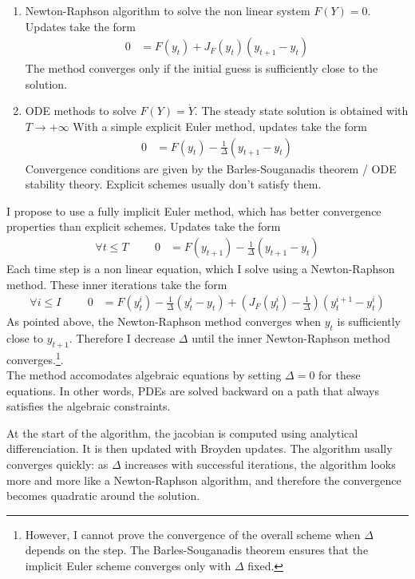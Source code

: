 \documentclass[english]{article}
\begin{document}
\begin{enumerate}
	\item Newton-Raphson algorithm to solve the non linear system $F (Y ) = 0$. Updates take the form
	\begin{align*}
		0 &= F(y_{t}) + J_{F}(y_t) (y_{t+1} - y_t)
	\end{align*}
	The method converges only if the initial guess is sufficiently close to the solution. 
	\item ODE methods to solve $F(Y) = \dot{Y}$. The steady state solution is obtained with $T\rightarrow +\infty$
	With a simple explicit Euler method, updates take the form
	\begin{align*}
		0&= F(y_t) - \frac{1}{\Delta} (y_{t+1} -y_{t})
	\end{align*}
	Convergence conditions are given by the Barles-Souganadis theorem / ODE stability theory. Explicit schemes usually don't satisfy them.
\end{enumerate}
I propose to use a fully implicit Euler method, which has better convergence properties than explicit schemes.  Updates take the form 
\begin{align*}
	\forall t \leq T \hspace{1cm} 0&= F(y_{t+1}) - \frac{1}{\Delta}(y_{t+1} -y_{t})
\end{align*}
Each time step is a non linear equation, which I solve using a Newton-Raphson method. These inner iterations take the form
\begin{align*}
	\forall i \leq I \hspace{1cm}	0 &= F(y_{t}^i) - \frac{1}{\Delta}(y_{t}^{i} -y_{t}) + (J_{F}(y_t^i) -  \frac{1}{\Delta})(y^{i+1}_{t} - y_t^i)
\end{align*}
As pointed above, the Newton-Raphson method converges when $y_t$ is sufficiently close to $y_{t+1}$. Therefore I decrease $\Delta$ until the inner Newton-Raphson method converges.\footnote{However, I cannot prove the convergence of the overall scheme when $\Delta$ depends on the step. The Barles-Souganadis theorem ensures that the implicit Euler scheme converges only with $\Delta$ fixed. }.\\
The method accomodates algebraic equations by setting $\Delta = 0$ for these equations. In other words, PDEs are solved backward on a path that always satisfies the algebraic constraints.


At the start of the algorithm, the jacobian is computed using analytical differenciation. It is then updated with Broyden updates. The algorithm usally converges quickly:  as $\Delta$ increases with successful iterations, the algorithm looks more and more like a Newton-Raphson algorithm, and therefore the convergence becomes quadratic around the solution.\\
\end{document}
